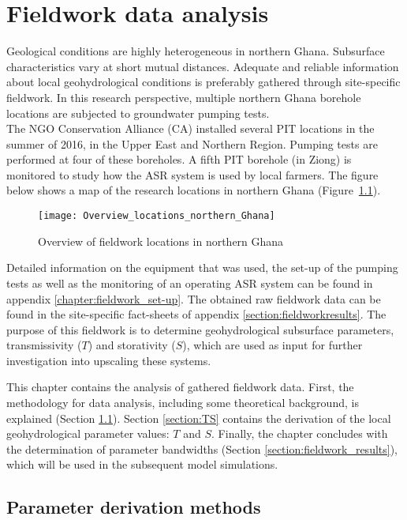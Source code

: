 \chapter{Fieldwork data analysis}
\label{Fieldwork_data_analysis}
Geological conditions are highly heterogeneous in northern Ghana. Subsurface characteristics vary at short mutual distances. Adequate and reliable information about local geohydrological conditions is preferably gathered through site-specific fieldwork. In this research perspective, multiple northern Ghana borehole locations are subjected to groundwater pumping tests. 
\bigskip \\
The NGO Conservation Alliance (CA) installed several PIT locations in the summer of 2016, in the Upper East and Northern Region. Pumping tests are performed at four of these boreholes. A fifth PIT borehole (in Ziong) is monitored to study how the ASR system is used by local farmers. The figure below shows a map  of the research locations in northern Ghana (Figure~\ref{fig:Overviewlocations}).
\bigskip 

\begin{figure}[ht]
 \centering
 \texttt{[image: Overview\_locations\_northern\_Ghana]}
 \captionsetup{justification=centering} 
 \caption{Overview of fieldwork locations in northern Ghana}
 \label{fig:Overviewlocations}
\end{figure}

Detailed information on the equipment that was used, the set-up of the pumping tests as well as the monitoring of an operating ASR system can be found in appendix \ref{chapter:fieldwork_set-up}. The obtained raw fieldwork data can be found in the site-specific fact-sheets of appendix \ref{section:fieldworkresults}. The purpose of this fieldwork is to determine geohydrological subsurface parameters, transmissivity ($T$) and storativity ($S$), which are used as input for further investigation into upscaling these systems. 

This chapter contains the analysis of gathered fieldwork data. First, the methodology for data analysis, including some theoretical background, is explained (Section \ref{section:derivation_methods}). Section \ref{section:TS} contains the derivation of the local geohydrological parameter values: $T$ and $S$. Finally, the chapter concludes with the determination of parameter bandwidths (Section \ref{section:fieldwork_results}), which will be used in the subsequent model simulations. 

\section{Parameter derivation methods}
\label{section:derivation_methods}

